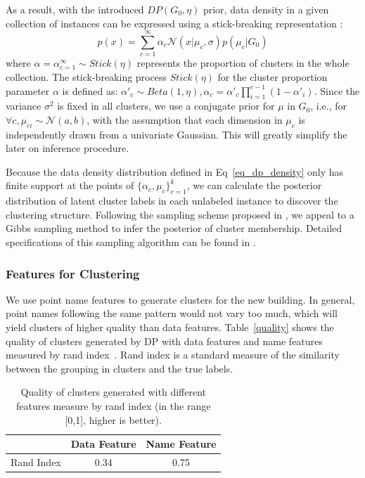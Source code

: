 As a result, with the introduced $DP(G_{0}, \eta)$ prior, data density in a given collection of instances can be expressed using a stick-breaking representation
\cite{sethuraman1994constructive}:
\begin{equation}\label{eq_dp_density}
p(x)=\sum_{c=1}^\infty \alpha_c \mathcal{N}(x|\mu_c,\sigma)p(\mu_c|G_0)
\end{equation}
where $\alpha={\alpha}_{c=1}^\infty\sim Stick(\eta)$ represents the proportion of clusters in the whole collection. The stick-breaking process $Stick(\eta)$ for the cluster proportion parameter $\alpha$ is defined as: $\alpha'_c\sim Beta(1, \eta), \alpha_c=\alpha'_c\prod_{i=1}^{c-1}(1-\alpha'_i)$. Since the variance $\sigma^2$ is fixed in all clusters, we use a conjugate prior for $\mu$ in $G_0$, i.e., for $\forall c, \mu_{ci}\sim \mathcal{N}(a,b)$, with the assumption that each dimension in $\mu_c$ is independently drawn from a univariate Gaussian. This will greatly simplify the later on inference procedure.

Because the data density distribution defined in Eq~\eqref{eq_dp_density} only has finite support at the points of $\{\alpha_c, \mu_c\}^k_{c=1}$, we can calculate the posterior distribution of latent cluster labels in each unlabeled instance to discover the clustering structure. Following the sampling scheme proposed in \cite{neal2000markov}, we appeal to a Gibbs sampling method to infer the posterior of cluster membership. Detailed specifications of this sampling algorithm can be found in \cite{neal2000markov}.

\subsubsection{Features for Clustering}
We use point name features to generate clusters for the new building. In general, point names following the same pattern would not vary too much, which will yield clusters of higher quality than data features.
Table~\ref{quality} shows the quality of clusters generated by DP with data features and name features measured by rand index~\cite{rand}. Rand index is a standard measure of the similarity between the grouping in clusters and the true labels.

\begin{table}[h]
\centering
\begin{tabular}{l|c|c}
\hline
                & Data Feature & Name Feature \\ \hline
Rand Index & 0.34       & 0.75       \\ \hline
\end{tabular}
\caption{Quality of clusters generated with different features measure by rand index (in the range [0,1], higher is better).}
\label{table:clf}
\end{table}

